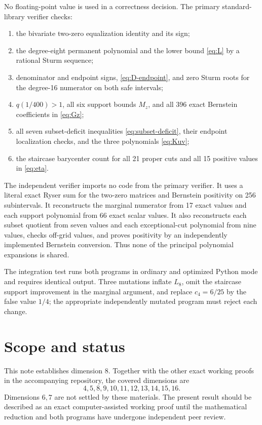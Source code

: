 \documentclass[11pt]{article}
\theoremstyle{remark}
\begin{document}
No floating-point value is used in a correctness decision.  The primary
standard-library verifier checks:
\begin{enumerate}
\item the bivariate two-zero equalization identity and its sign;
\item the degree-eight permanent polynomial and the lower bound \eqref{eq:L}
by a rational Sturm sequence;
\item denominator and endpoint signs, \eqref{eq:D-endpoint}, and zero Sturm
roots for the degree-16 numerator on both safe intervals;
\item $q(1/400)>1$, all six support bounds $M_z$, and all 396 exact
Bernstein coefficients in \eqref{eq:Gz};
\item all seven subset-deficit inequalities \eqref{eq:subset-deficit}, their
endpoint localization checks, and the three polynomials \eqref{eq:Kuv};
\item the staircase barycenter count for all 21 proper cuts and all 15
positive values in \eqref{eq:eta}.
\end{enumerate}

The independent verifier imports no code from the primary verifier.  It uses
a literal exact Ryser sum for the two-zero matrices and Bernstein positivity
on 256 subintervals.  It reconstructs the marginal numerator from 17 exact
values and each support polynomial from 66 exact scalar values.  It also
reconstructs each subset quotient from seven values and each exceptional-cut
polynomial from nine values, checks off-grid values, and proves positivity by
an independently implemented Bernstein conversion.  Thus none of the
principal polynomial expansions is shared.

The integration test runs both programs in ordinary and optimized Python mode
and requires identical output.  Three mutations inflate $L_8$, omit the
staircase support improvement in the marginal argument, and replace
$c_4=6/25$ by the false value $1/4$; the appropriate independently mutated
program must reject each change.

\section{Scope and status}

This note establishes dimension 8.  Together with the other exact working
proofs in the accompanying repository, the covered dimensions are
\[
 4,5,8,9,10,11,12,13,14,15,16.
\]
Dimensions $6,7$ are not settled by these materials.  The present result
should be described as an exact computer-assisted working proof until the
mathematical reduction and both programs have undergone independent peer
review.
\end{document}
